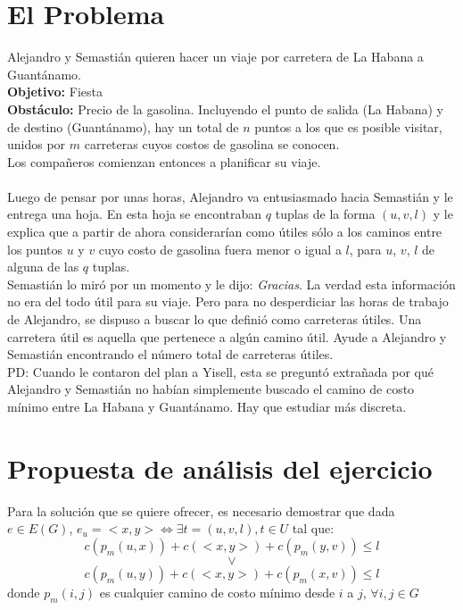 \documentclass[10pt]{article}
\begin{document}
\section{El Problema}

Alejandro y Semastián quieren hacer un viaje por carretera de La Habana a Guantánamo. \\
\textbf{Objetivo:} Fiesta \\
\textbf{Obstáculo:} Precio de la gasolina. Incluyendo el punto de salida (La Habana) y de destino (Guantánamo), hay un total de $n$ puntos a los que es posible visitar, unidos por $m$ carreteras cuyos costos de gasolina se conocen.\\
Los compañeros comienzan entonces a planificar su viaje. \\
\\
Luego de pensar por unas horas, Alejandro va entusiasmado hacia Semastián y le entrega una hoja. En esta hoja se encontraban $q$ tuplas de la forma $(u,v,l)$ y le explica que a partir de ahora considerarían como útiles sólo a los caminos entre los puntos $u$ y $v$ cuyo costo de gasolina fuera menor o igual a $l$, para $u$, $v$, $l$ de alguna de las $q$ tuplas. \\

Semastián lo miró por un momento y le dijo: \textit{Gracias}. La verdad esta información no era del todo útil para su viaje. Pero para no desperdiciar las horas de trabajo de Alejandro, se dispuso a buscar lo que definió como carreteras útiles. Una carretera útil es aquella que pertenece a algún camino útil. Ayude a Alejandro y Semastián encontrando el número total de carreteras útiles. \\

PD: Cuando le contaron del plan a Yisell, esta se preguntó extrañada por qué Alejandro y Semastián no habían simplemente buscado el camino de costo mínimo entre La Habana y Guantánamo. Hay que estudiar más discreta.

\section{Propuesta de análisis del ejercicio}

Para la solución que se quiere ofrecer, es necesario demostrar que dada \\ $e \in E(G)$, $e_u = <x,y> \Leftrightarrow \exists t = (u,v,l), t \in U$ tal que:
$$c(p_m(u,x)) + c(<x,y>) + c(p_m(y,v)) \leq l$$
$$\lor$$
$$c(p_m(u,y)) + c(<x,y>) + c(p_m(x,v)) \leq l$$
donde $p_m(i,j)$ es cualquier camino de costo mínimo desde $i$ a $j$, $\forall i,j \in G$
\end{document}
